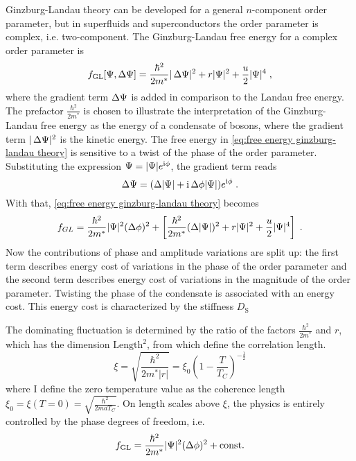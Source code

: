 \documentclass[../notes.tex]{subfiles}
\begin{document}
Ginzburg-Landau theory can be developed for a general \(n\)-component order parameter, but in superfluids and superconductors the order parameter is complex, i.e. two-component.
The Ginzburg-Landau free energy for a complex order parameter is
\begin{equation}
	f_{\mathrm{GL}} [\Psi, \adif{\Psi}] = \frac{\hbar^2}{2m^*} \vert \adif{\Psi} \vert^2 + r \vert \Psi \vert^2 + \frac{u}{2} \vert \Psi \vert^4 \;,
	\label{eq:free energy ginzburg-landau theory}
\end{equation}
where the gradient term \(\adif{\Psi}\) is added in comparison to the Landau free energy.
The prefactor \(\frac{\hbar^2}{2m^*}\) is chosen to illustrate the interpretation of the Ginzburg-Landau free energy as the energy of a condensate of bosons, where the gradient term \(\vert \adif{\Psi} \vert^2\) is the kinetic energy.
The free energy in \cref{eq:free energy ginzburg-landau theory} is sensitive to a twist of the phase of the order parameter.
Substituting the expression \(\Psi = \vert \Psi \vert e^{\mathrm{i} \phi}\), the gradient term reads
\begin{equation}
	\Delta \Psi = (\adif{\vert \Psi \vert} + \iu \adif{\phi} \vert \Psi \vert) e^{\iu \phi} \;.
\end{equation}
With that, \cref{eq:free energy ginzburg-landau theory} becomes
\begin{equation}
	f_{GL}  = \frac{\hbar^2}{2m^*} \vert \Psi \vert^2 (\adif{\phi})^2 + \left[ \frac{\hbar^2}{2m^*} (\adif{\vert \Psi \vert})^2 + r \vert \Psi \vert^2 + \frac{u}{2} \vert \Psi \vert^4 \right] \;.
	\label{eq:free energy ginzburg-landau theory with phase}
\end{equation}
Now the contributions of phase and amplitude variations are split up: the first term describes energy cost of variations in the phase of the order parameter and the second term describes energy cost of variations in the magnitude of the order parameter.
Twisting the phase of the condensate is associated with an energy cost.
This energy cost is characterized by the stiffness \(D_{\mathrm{S}}\)



The dominating fluctuation is determined by the ratio of the factors \(\frac{\hbar^2}{2m^*}\) and \(r\), which has the dimension \(\mathrm{Length}^2\), from which define the correlation length.
\begin{equation}
	\xi = \sqrt{\frac{\hbar^2}{2m^* \vert r \vert}} = \xi_0 \left(1 - \frac{T}{T_C}\right)^{-\frac{1}{2}}
	\label{eq:correlation length GL theory}
\end{equation}
where I define the zero temperature value as the coherence length \(\xi_0 = \xi(T=0) = \sqrt{\frac{\hbar^2}{2 m a T_C}}\).
On length scales above \(\xi\), the physics is entirely controlled by the phase degrees of freedom, i.e.
\begin{equation}
	f_{\mathrm{GL}} = \frac{\hbar^2}{2 m^*} \vert \Psi \vert^2 (\adif{\phi})^2 + \mathrm{const.}
\end{equation}
\end{document}
